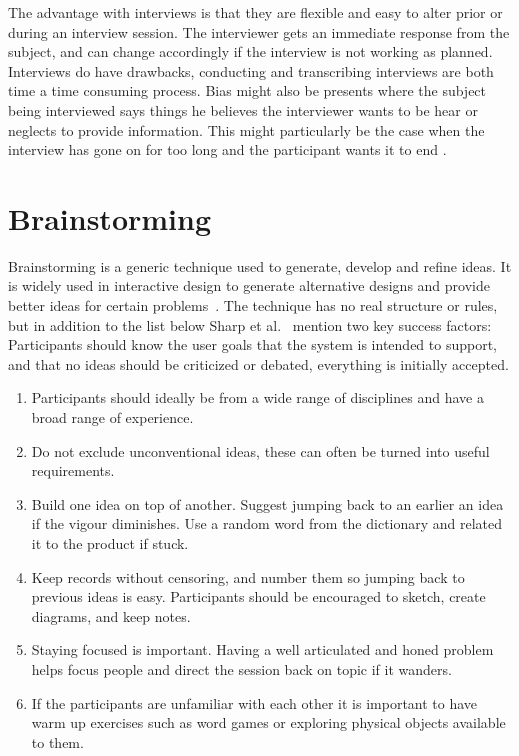 The advantage with interviews is that they are flexible and easy to alter prior or during an interview session. The interviewer gets an immediate response from the subject, and can change accordingly if the interview is not working as planned. Interviews do have drawbacks, conducting and transcribing interviews are both time a time consuming process. Bias might also be presents where the subject being interviewed says things he believes the interviewer wants to be hear or neglects to provide information. This might particularly be the case when the interview has gone on for too long and the participant wants it to end \cite{realWorldResearch}.

\section{Brainstorming}
\label{sec:brainstorming}
Brainstorming is a generic technique used to generate, develop and refine ideas. It is widely used in interactive design to generate alternative designs and provide better ideas for certain problems~\cite{interactionDesign}. The technique has no real structure or rules, but in addition to the list below Sharp et al.~\cite{interactionDesign} mention two key success factors: Participants should know the user goals that the system is intended to support, and that no ideas should be criticized or debated, everything is initially accepted.

\begin{enumerate}
  \item Participants should ideally be from a wide range of disciplines and have a broad range of experience.
  \item Do not exclude unconventional ideas, these can often be turned into useful requirements.
  \item Build one idea on top of another. Suggest jumping back to an earlier an idea if the vigour diminishes. Use a random word from the dictionary and related it to the product if stuck.
  \item Keep records without censoring, and number them so jumping back to previous ideas is easy. Participants should be encouraged to sketch, create diagrams, and keep notes.
  \item Staying focused is important. Having a well articulated and honed problem helps focus people and direct the session back on topic if it wanders.
  \item If the participants are unfamiliar with each other it is important to have warm up exercises such as word games or exploring physical objects available to them.
\end{enumerate}

